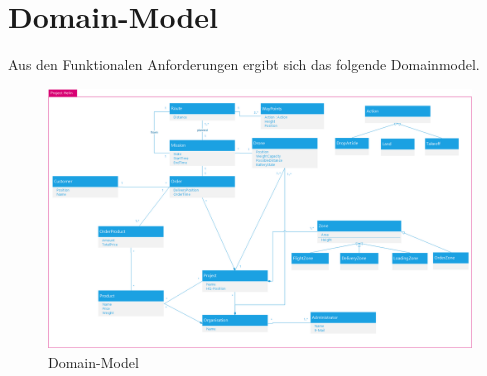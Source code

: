 \section{Domain-Model}

Aus den Funktionalen Anforderungen ergibt sich das folgende Domainmodel.

\begin{figure}[h]
	\includegraphics[width=1.0\textwidth]{images/domainmodell.png} 
	\caption{Domain-Model} 
	\label{fig:domain-model}
\end{figure}

